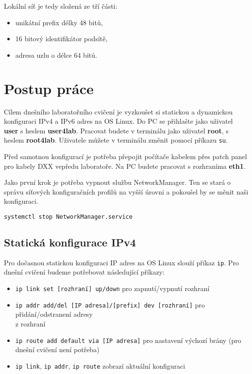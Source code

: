 \documentclass[a4paper,11pt,draft]{article}
\begin{document}
Lokální síť je tedy složená ze tří části:
\begin{itemize}
    \item unikátní prefix délky 48 bitů,
    \item 16 bitový identifikátor podsítě,
    \item adresa uzlu o délce 64 bitů.
\end{itemize}

\section{Postup práce}
Cílem dnešního laboratořního cvičení je vyzkoušet si statickou a dynamickou
konfiguraci IPv4 a IPv6 adres na OS Linux. Do PC se přihlašte jako uživatel
{\bf user} s heslem {\bf user4lab}. Pracovat budete v terminálu jako
uživatel {\bf root}, s heslem {\bf root4lab}. Uživatele můžete v terminálu
změnit pomocí příkazu {\tt su}.

Před samotnou konfigurací je potřeba přepojit počítače kabelem přes patch panel
pro kabely DXX vepředu laboratoře. Na PC budete pracovat s rozhraníma {\bf
eth1}.

Jako první krok je potřeba vypnout službu NetworkManager. Ten se stará o správu
síťových konfiguračních profilů na vyšší úrovni a pokoušel by se měnit naši
konfiguraci.
\begin{verbatim}
systemctl stop NetworkManager.service
\end{verbatim}

\subsection{Statická konfigurace IPv4}
Pro dočasnou statickou konfiguraci IP adres na OS Linux slouží příkaz {\tt ip}.
Pro dnešní cvičení budeme potřebovat následující příkazy:
\begin{itemize}
    \item \verb_ip link set [rozhraní] up/down_ pro zapnutí/vypnutí rozhraní
    \item \verb_ip addr add/del [IP adresa]/[prefix] dev [rozhraní]_ pro
        přidání/odstranení adresy\\z rozhraní
    \item \verb_ip route add default via [IP adresa]_ pro nastavení výchozí
        brány (pro dnešní cvičení není potřeba)
    \item \verb_ip link_, \verb_ip addr_, \verb_ip route_ zobrazí aktuální
        konfiguraci
\end{itemize}
\end{document}
